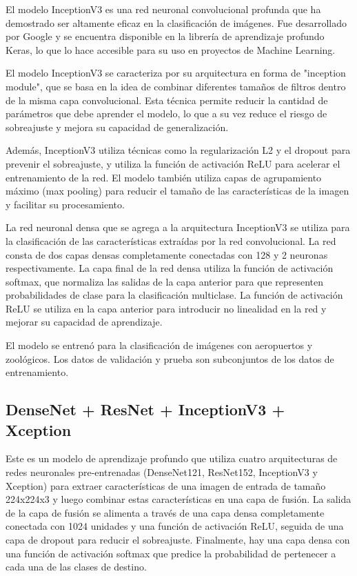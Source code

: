 \documentclass[article]{llncs}
\begin{document}
El modelo InceptionV3 es una red neuronal convolucional profunda que ha demostrado ser altamente eficaz en la 
clasificación de imágenes. Fue desarrollado por Google y se encuentra disponible en la librería de aprendizaje profundo 
Keras, lo que lo hace accesible para su uso en proyectos de Machine Learning.

El modelo InceptionV3 se caracteriza por su arquitectura en forma de "inception module", que se basa en la idea de 
combinar diferentes tamaños de filtros dentro de la misma capa convolucional. Esta técnica permite reducir la cantidad 
de parámetros que debe aprender el modelo, lo que a su vez reduce el riesgo de sobreajuste y mejora su capacidad de 
generalización.

Además, InceptionV3 utiliza técnicas como la regularización L2 y el dropout para prevenir el sobreajuste, y utiliza la 
función de activación ReLU para acelerar el entrenamiento de la red. El modelo también utiliza capas de agrupamiento 
máximo (max pooling) para reducir el tamaño de las características de la imagen y facilitar su procesamiento.

La red neuronal densa que se agrega a la arquitectura InceptionV3 se utiliza para la clasificación de las características 
extraídas por la red convolucional. La red consta de dos capas densas completamente conectadas con 128 y 2 neuronas respectivamente. 
La capa final de la red densa utiliza la función de activación softmax, que normaliza 
las salidas de la capa anterior para que representen probabilidades de clase para la clasificación multiclase. La función 
de activación ReLU se utiliza en la capa anterior para introducir no linealidad en la red y mejorar su capacidad de 
aprendizaje.

El modelo se entren\'o para la clasificación de im\'agenes con aeropuertos y zool\'ogicos. Los datos de validaci\'on y prueba 
son subconjuntos de los datos de entrenamiento.


\subsection{DenseNet + ResNet + InceptionV3 + Xception}

Este es un modelo de aprendizaje profundo que utiliza cuatro arquitecturas de redes neuronales pre-entrenadas 
(DenseNet121, ResNet152, InceptionV3 y Xception) para extraer características de una imagen de entrada de tamaño 
224x224x3 y luego combinar estas características en una capa de fusión. La salida de la capa de fusión se alimenta a 
través de una capa densa completamente conectada con 1024 unidades y una función de activación ReLU, seguida de una capa 
de dropout para reducir el sobreajuste. Finalmente, hay una capa densa con una función de activación softmax que predice 
la probabilidad de pertenecer a cada una de las clases de destino.
\end{document}

